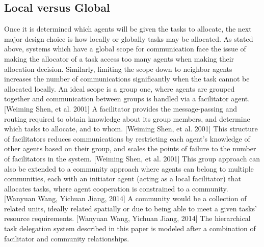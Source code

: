 \documentclass[12pt,letterpaper,onecolumn]{article}
\begin{document}
	\subsection{Local versus Global}
	Once it is determined which agents will be given the tasks to allocate, the next major design choice is how locally or globally tasks may be allocated. As stated above, systems which have a global scope for communication face the issue of making the allocator of a task access too many agents when making their allocation decision. Similarly, limiting the scope down to neighbor agents increases the number of communications significantly when the task cannot be allocated locally. An ideal scope is a group one, where agents are grouped together and communication between groups is handled via a facilitator agent. [Weiming Shen, et al. 2001] A facilitator provides the message-passing and routing required to  obtain knowledge about its group members, and determine which tasks to allocate, and to whom. [Weiming Shen, et al. 2001] This structure of facilitators reduces communications by restricting each agent's knowledge of other agents based on their group, and scales the points of failure to the number of facilitators in the system. [Weiming Shen, et al. 2001] This group approach can also be extended to a community approach where agents can belong to multiple communities, each with an initiator agent (acting as a local facilitator) that allocates tasks, where agent cooperation is constrained to a community. [Wanyuan Wang, Yichuan Jiang, 2014] A community would be a collection of related units, ideally related spatially or due to being able to meet a given tasks' resource requirements. [Wanyuan Wang, Yichuan Jiang, 2014] The hierarchical task delegation system described in this paper is modeled after a combination of facilitator and community relationships.
\end{document}
